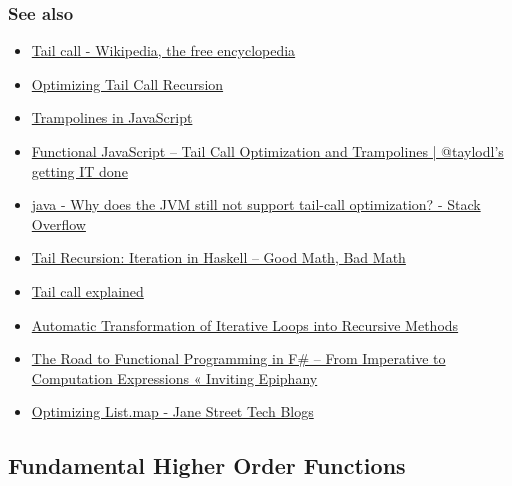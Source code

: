 \documentclass[11pt]{article}
\begin{document}
\subsubsection{See also}
\label{sec-1-8-5}

\begin{itemize}
\item \href{https://en.wikipedia.org/wiki/Tail_call}{Tail call - Wikipedia, the free encyclopedia}

\item \href{https://spin.atomicobject.com/2014/11/05/tail-call-recursion-optimization/}{Optimizing Tail Call Recursion}

\item \href{http://raganwald.com/2013/03/28/trampolines-in-javascript.html}{Trampolines in JavaScript}

\item \href{https://taylodl.wordpress.com/2013/06/07/functional-javascript-tail-call-optimization-and-trampolines/}{Functional JavaScript – Tail Call Optimization and Trampolines | @taylodl's getting IT done}

\item \href{http://stackoverflow.com/questions/3616483/why-does-the-jvm-still-not-support-tail-call-optimization}{java - Why does the JVM still not support tail-call optimization? - Stack Overflow}

\item \href{http://scienceblogs.com/goodmath/2006/12/20/tail-recursion-iteration-in-ha-1/}{Tail Recursion: Iteration in Haskell – Good Math, Bad Math}

\item \href{http://everything.explained.today/Tail_call/}{Tail call explained}

\item \href{http://users.dsic.upv.es/~jsilva/papers/TechReport-iter2rec.pdf}{Automatic Transformation of Iterative Loops into Recursive Methods}

\item \href{http://richardminerich.com/2011/02/the-road-to-functional-programming-in-f-from-imperative-to-computation-expressions/}{The Road to Functional Programming in F\# – From Imperative to Computation Expressions « Inviting Epiphany}

\item \href{https://blogs.janestreet.com/optimizing-list-map/}{Optimizing List.map - Jane Street Tech Blogs}
\end{itemize}
\subsection{Fundamental Higher Order Functions}
\label{sec-1-9}
\end{document}
